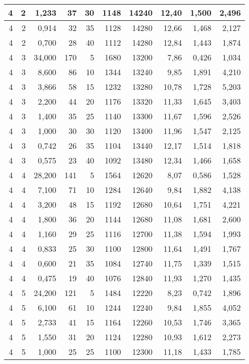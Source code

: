 \begin{tabular}{rrrrrrrrrr}
4 & 2 & 1,233 & 37 & 30 & 1148 & 14240 & 12,40 & 1,500 & 2,496 \\ \hline
4 & 2 & 0,914 & 32 & 35 & 1128 & 14280 & 12,66 & 1,468 & 2,127 \\ \hline
4 & 2 & 0,700 & 28 & 40 & 1112 & 14280 & 12,84 & 1,443 & 1,874 \\ \hline
4 & 3 & 34,000 & 170 & 5 & 1680 & 13200 & 7,86 & 0,426 & 1,034 \\ \hline
4 & 3 & 8,600 & 86 & 10 & 1344 & 13240 & 9,85 & 1,891 & 4,210 \\ \hline
4 & 3 & 3,866 & 58 & 15 & 1232 & 13280 & 10,78 & 1,728 & 5,203 \\ \hline
4 & 3 & 2,200 & 44 & 20 & 1176 & 13320 & 11,33 & 1,645 & 3,403 \\ \hline
4 & 3 & 1,400 & 35 & 25 & 1140 & 13300 & 11,67 & 1,596 & 2,526 \\ \hline
4 & 3 & 1,000 & 30 & 30 & 1120 & 13400 & 11,96 & 1,547 & 2,125 \\ \hline
4 & 3 & 0,742 & 26 & 35 & 1104 & 13440 & 12,17 & 1,514 & 1,818 \\ \hline
4 & 3 & 0,575 & 23 & 40 & 1092 & 13480 & 12,34 & 1,466 & 1,658 \\ \hline
4 & 4 & 28,200 & 141 & 5 & 1564 & 12620 & 8,07 & 0,586 & 1,528 \\ \hline
4 & 4 & 7,100 & 71 & 10 & 1284 & 12640 & 9,84 & 1,882 & 4,138 \\ \hline
4 & 4 & 3,200 & 48 & 15 & 1192 & 12680 & 10,64 & 1,751 & 4,221 \\ \hline
4 & 4 & 1,800 & 36 & 20 & 1144 & 12680 & 11,08 & 1,681 & 2,600 \\ \hline
4 & 4 & 1,160 & 29 & 25 & 1116 & 12700 & 11,38 & 1,594 & 1,993 \\ \hline
4 & 4 & 0,833 & 25 & 30 & 1100 & 12800 & 11,64 & 1,491 & 1,767 \\ \hline
4 & 4 & 0,600 & 21 & 35 & 1084 & 12740 & 11,75 & 1,339 & 1,515 \\ \hline
4 & 4 & 0,475 & 19 & 40 & 1076 & 12840 & 11,93 & 1,270 & 1,435 \\ \hline
4 & 5 & 24,200 & 121 & 5 & 1484 & 12220 & 8,23 & 0,742 & 1,896 \\ \hline
4 & 5 & 6,100 & 61 & 10 & 1244 & 12240 & 9,84 & 1,855 & 4,052 \\ \hline
4 & 5 & 2,733 & 41 & 15 & 1164 & 12260 & 10,53 & 1,746 & 3,365 \\ \hline
4 & 5 & 1,550 & 31 & 20 & 1124 & 12280 & 10,93 & 1,612 & 2,273 \\ \hline
4 & 5 & 1,000 & 25 & 25 & 1100 & 12300 & 11,18 & 1,433 & 1,785 \\ \hline

\end{tabular}
